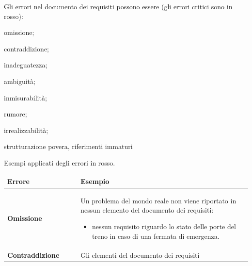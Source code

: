 \documentclass[italian]{article}
\begin{document}
		Gli errori nel documento dei requisiti possono essere (gli errori critici sono in rosso):
		\begin{itemize}
			{\color{red}\item omissione;
			\item contraddizione;
			\item inadeguatezza;
			\item ambiguità;}
			\item inmisurabilità;
			\item rumore;
			\item irrealizzabilità;
			\item strutturazione povera, riferimenti immaturi
		\end{itemize}
		Esempi applicati degli errori in rosso.
		\begin{table}[th]
			\centering
			\begin{tabular}{|m{0.3\linewidth}|m{0.7\linewidth}|}
				\hline
				\textbf{Errore} & \textbf{Esempio}\\
				\hline
				\textbf{Omissione} & Un problema del mondo reale non viene riportato in nessun elemento del documento dei requisiti:
				\begin{itemize}
					\item nessun requisito riguardo lo stato delle porte del treno in caso di una fermata di emergenza.
				\end{itemize}\\
				\hline
				\textbf{Contraddizione} & Gli elementi del documento dei requisiti \\

				\hline
			\end{tabular}
		\end{table}
\end{document}
